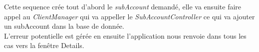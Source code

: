 Cette sequence crée tout d'abord le \emph{subAccount} demandé, elle va ensuite faire appel au \emph{ClientManager} qui va appeller 
le \emph{SubAccountController} ce qui va ajouter un subAccount dans la base de donnée.\\
L'erreur potentielle est gérée en ensuite l'application nous renvoie dans tous les cas vers la fenêtre Details.